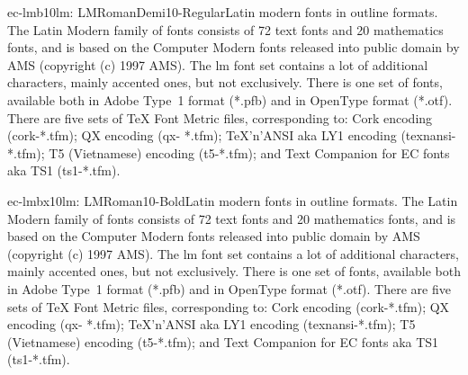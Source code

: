 \documentclass{ddltxtyp}
\begin{document}
\begin{package}{ec-lmb10}{lm: LMRomanDemi10-Regular}{Latin modern fonts in outline formats.}
The Latin Modern family of fonts consists of 72 text fonts and
20 mathematics fonts, and is based on the Computer Modern fonts
released into public domain by AMS (copyright (c) 1997 AMS).
The lm font set contains a lot of additional characters, mainly
accented ones, but not exclusively. There is one set of fonts,
available both in Adobe Type~1 format (*.pfb) and in OpenType
format (*.otf). There are five sets of {\TeX} Font Metric files,
corresponding to: Cork encoding (cork-*.tfm); QX encoding (qx-
*.tfm); {\TeX}'n'ANSI aka LY1 encoding (texnansi-*.tfm); T5
(Vietnamese) encoding (t5-*.tfm); and Text Companion for EC
fonts aka TS1 (ts1-*.tfm).
\end{package}
\begin{package}{ec-lmbx10}{lm: LMRoman10-Bold}{Latin modern fonts in outline formats.}
The Latin Modern family of fonts consists of 72 text fonts and
20 mathematics fonts, and is based on the Computer Modern fonts
released into public domain by AMS (copyright (c) 1997 AMS).
The lm font set contains a lot of additional characters, mainly
accented ones, but not exclusively. There is one set of fonts,
available both in Adobe Type~1 format (*.pfb) and in OpenType
format (*.otf). There are five sets of {\TeX} Font Metric files,
corresponding to: Cork encoding (cork-*.tfm); QX encoding (qx-
*.tfm); {\TeX}'n'ANSI aka LY1 encoding (texnansi-*.tfm); T5
(Vietnamese) encoding (t5-*.tfm); and Text Companion for EC
fonts aka TS1 (ts1-*.tfm).
\end{package}
\end{document}
